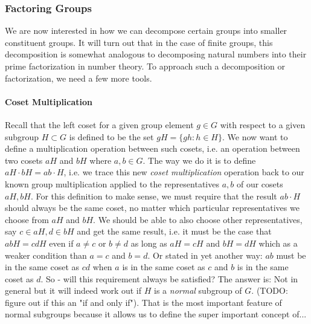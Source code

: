 \subsubsection{Factoring Groups}
We are now interested in how we can decompose certain groups into smaller constituent groups. It will turn out that in the case of finite groups, this decomposition is somewhat analogous to decomposing natural numbers into their prime factorization in number theory. To approach such a decomposition or factorization, we need a few more tools.


\paragraph{Coset Multiplication}
Recall that the left coset for a given group element $g \in G$ with respect to a given subgroup $H \subset G$ is defined to be the set $g H = \{ g h : h \in H \}$. We now want to define a multiplication operation between such cosets, i.e. an operation between two cosets $a H$ and $b H$ where $a,b \in G$. The way we do it is to define $a H \cdot b H = a b \cdot H$, i.e. we trace this new \emph{coset multiplication} operation back to our known group multiplication applied to the representatives $a, b$ of our cosets $a H, b H$. For this definition to make sense, we must require that the result $ab \cdot H$ should always be the same coset, no matter which particular representatives we choose from $aH$ and $bH$. We should be able to also choose other representatives, say $c \in a H, d \in b H$ and get the same result, i.e. it must be the case that $a b H = c d H$ even if $a \neq c$ or $b \neq d$ as long as $a H = c H$ and $b H = d H$ which as a weaker condition than $a = c$ and $b = d$. Or stated in yet another way:  $ab$ must be in the same coset as $cd$ when $a$ is in the same coset as $c$ and $b$ is in the same coset as $d$. So - will this requirement always be satisfied? The answer is: Not in general but it will indeed work out if $H$ is a \emph{normal} subgroup of $G$. (TODO: figure out if this an "if and only if"). That is the most important feature of normal subgroups because it allows us to define the super important concept of...

